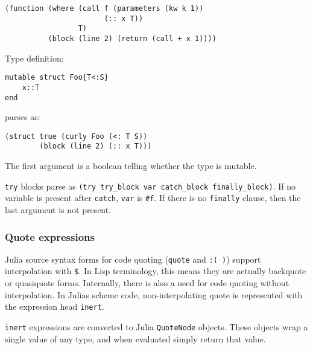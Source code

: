 \begin{lstlisting}
(function (where (call f (parameters (kw k 1))
                       (:: x T))
                 T)
          (block (line 2) (return (call + x 1))))
\end{lstlisting}



Type definition:




\begin{verbatim}
mutable struct Foo{T<:S}
    x::T
end
\end{verbatim}



parses as:




\begin{lstlisting}
(struct true (curly Foo (<: T S))
        (block (line 2) (:: x T)))
\end{lstlisting}



The first argument is a boolean telling whether the type is mutable.



\texttt{try} blocks parse as \texttt{(try try\_block var catch\_block finally\_block)}. If no variable is present after \texttt{catch}, \texttt{var} is \texttt{\#f}. If there is no \texttt{finally} clause, then the last argument is not present.



\hypertarget{15188092119950048030}{}


\subsubsection{Quote expressions}



Julia source syntax forms for code quoting (\texttt{quote} and \texttt{:( )}) support interpolation with \texttt{\$}. In Lisp terminology, this means they are actually {\textquotedbl}backquote{\textquotedbl} or {\textquotedbl}quasiquote{\textquotedbl} forms. Internally, there is also a need for code quoting without interpolation. In Julia{\textquotesingle}s scheme code, non-interpolating quote is represented with the expression head \texttt{inert}.



\texttt{inert} expressions are converted to Julia \texttt{QuoteNode} objects. These objects wrap a single value of any type, and when evaluated simply return that value.



